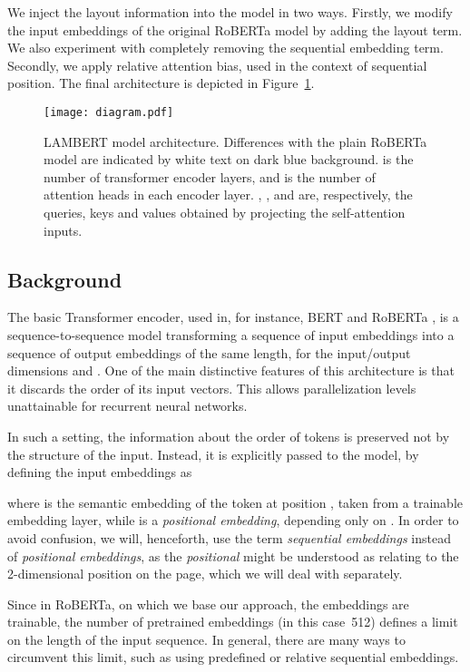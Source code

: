 We inject the layout information into the model in two ways. Firstly, we modify
the input embeddings of the original RoBERTa model by adding the layout term. We
also experiment with completely removing the sequential embedding term.
Secondly, we apply relative attention bias, used
 in the context of sequential position.
The final architecture is depicted in Figure~\ref{fig:architecture}.

\begin{figure}[htb]
  \centering
  \texttt{[image: diagram.pdf]}
  \caption{LAMBERT model architecture. Differences with the plain RoBERTa model
    are indicated by white text on dark blue background.  is the number
    of transformer encoder layers, and  is the number of attention heads
    in each encoder layer. , , and  are, respectively, the queries,
    keys and values obtained by projecting the self-attention inputs.}
  \label{fig:architecture}
\end{figure}

\subsection{Background}
\label{sec:bert}

The basic Transformer encoder, used in, for instance, BERT
\citep{devlin2019-bert} and RoBERTa \citep{liu2019-roberta}, is a
sequence-to-sequence model transforming a sequence of input embeddings
 into a sequence of output embeddings  of the same
length, for the input/output dimensions  and . One of the main
distinctive features of this architecture is that it discards the order of its
input vectors. This allows parallelization levels unattainable for recurrent neural
networks.

In such a setting, the information about the order of tokens is preserved not by
the structure of the input. Instead, it is explicitly passed to the model, by
defining the input embeddings as

where  is the semantic embedding of the token at position ,
taken from a trainable embedding layer, while  is a
\emph{positional embedding}, depending only on . In order to avoid
confusion, we will, henceforth, use the term \emph{sequential embeddings}
instead of \emph{positional embeddings}, as the \emph{positional} might be
understood as relating to the 2-dimensional position on the page, which we will
deal with separately.

Since in RoBERTa, on which we base our approach, the embeddings  are
trainable, the number of pretrained embeddings (in this case~512) defines a
limit on the length of the input sequence. In general, there are many ways to
circumvent this limit, such as using predefined \citep{Vaswani2017-transformer}
or relative \citep{dai2019-transformer-xl} sequential embeddings.


